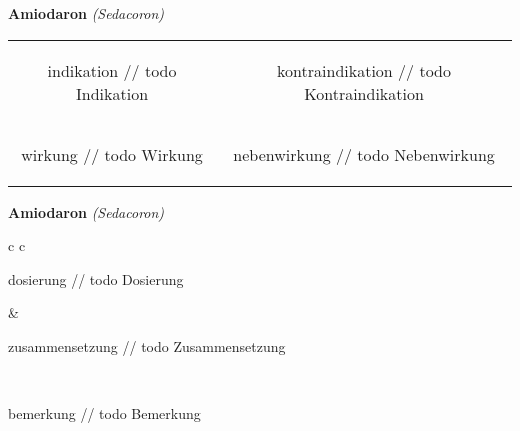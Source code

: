 \documentclass[12pt]{beamer}
\begin{document}
\begin{frame}{
    \textbf{Amiodaron}
    \textit{(Sedacoron)}
}
    \begin{tabular}{c c}
        \begin{beamercolorbox}[wd=\boxwidth\textwidth,ht=\boxheight\textheight,sep=1em]{indikation}
        // todo Indikation
        \end{beamercolorbox} & 
        \begin{beamercolorbox}[wd=\boxwidth\textwidth,ht=\boxheight\textheight,sep=1em]{kontraindikation}
        // todo Kontraindikation 
        \end{beamercolorbox} \\
        \begin{beamercolorbox}[wd=\boxwidth\textwidth,ht=\boxheight\textheight,sep=1em]{wirkung}
        // todo Wirkung
        \end{beamercolorbox} & 
        \begin{beamercolorbox}[wd=\boxwidth\textwidth,ht=\boxheight\textheight,sep=1em]{nebenwirkung}
        // todo Nebenwirkung
        \end{beamercolorbox} \\
    \end{tabular}
\end{frame}

\begin{frame}{
    \textbf{Amiodaron}
    \textit{(Sedacoron)}
}
    \begin{tabular}{c c}
        \begin{beamercolorbox}[wd=\boxwidth\textwidth,ht=\boxheight\textheight,sep=1em]{dosierung}
        // todo Dosierung
        \end{beamercolorbox} & 
        \begin{beamercolorbox}[wd=\boxwidth\textwidth,ht=\boxheight\textheight,sep=1em]{zusammensetzung}
        // todo Zusammensetzung
        \end{beamercolorbox} \\
        \begin{beamercolorbox}[wd=\textwidth,ht=\boxheight\textheight,sep=1em]{bemerkung}
        // todo Bemerkung
        \end{beamercolorbox} \\
    \end{tabular}
\end{frame}
\end{document}
